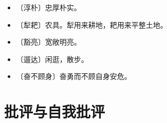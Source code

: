 \documentclass[12pt,UTF-8,openany]{ctexbook}
\begin{document}
\vspace{-1em}

\begin{itemize}
    \setlength\itemsep{-0.2em}
    \item 〔淳朴〕忠厚朴实。
    \item 〔犁耙〕农具。犁用来耕地，耙用来平整土地。
    \item 〔豁亮〕宽敞明亮。
    \item 〔遛达〕闲逛，散步。
    \item 〔奋不顾身〕奋勇而不顾自身安危。
\end{itemize}

\chapter{批评与自我批评}
\end{document}
